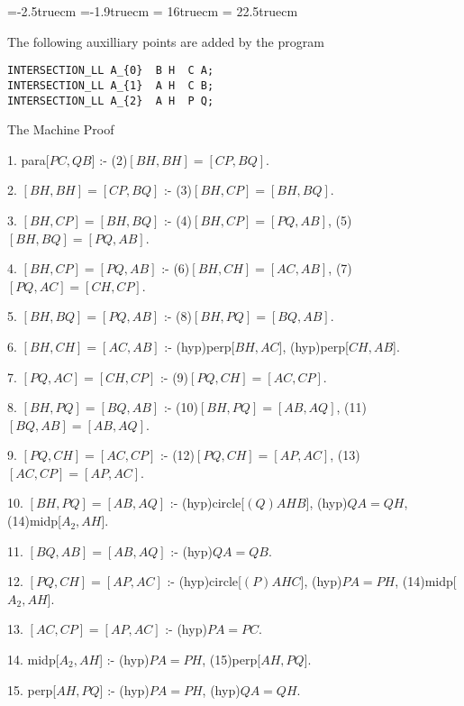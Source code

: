 \voffset=-2.5truecm
\hoffset=-1.9truecm
\textwidth = 16truecm
\textheight = 22.5truecm
\parskip=8pt
\parindent=15pt
\def\fa#1#2{\langle{#1},{#2}\rangle}

The following auxilliary points are added by the program

\begin{verbatim}
INTERSECTION_LL A_{0}  B H  C A;
INTERSECTION_LL A_{1}  A H  C B;
INTERSECTION_LL A_{2}  A H  P Q;
\end{verbatim}


{\vskip6pt \parskip=6pt \parindent=10pt 
The Machine Proof


1. para[$PC,QB$] :- (2)$[BH,BH]=[CP,BQ]$.

2. $[BH,BH]=[CP,BQ]$ :- (3)$[BH,CP]=[BH,BQ]$.

3. $[BH,CP]=[BH,BQ]$ :- (4)$[BH,CP]=[PQ,AB]$, (5)$[BH,BQ]=[PQ,AB]$.

4. $[BH,CP]=[PQ,AB]$ :- (6)$[BH,CH]=[AC,AB]$, (7)$[PQ,AC]=[CH,CP]$.

5. $[BH,BQ]=[PQ,AB]$ :- (8)$[BH,PQ]=[BQ,AB]$.

6. $[BH,CH]=[AC,AB]$ :- (hyp)perp[$BH,AC$], (hyp)perp[$CH,AB$].

7. $[PQ,AC]=[CH,CP]$ :- (9)$[PQ,CH]=[AC,CP]$.

8. $[BH,PQ]=[BQ,AB]$ :- (10)$[BH,PQ]=[AB,AQ]$, (11)$[BQ,AB]=[AB,AQ]$.

9. $[PQ,CH]=[AC,CP]$ :- (12)$[PQ,CH]=[AP,AC]$, (13)$[AC,CP]=[AP,AC]$.

10. $[BH,PQ]=[AB,AQ]$ :- (hyp)circle[$(Q)AHB$], (hyp)$QA = QH$, (14)midp[$A_{2},AH$].

11. $[BQ,AB]=[AB,AQ]$ :- (hyp)$QA = QB$.

12. $[PQ,CH]=[AP,AC]$ :- (hyp)circle[$(P)AHC$], (hyp)$PA = PH$, (14)midp[$A_{2},AH$].

13. $[AC,CP]=[AP,AC]$ :- (hyp)$PA = PC$.

14. midp[$A_{2},AH$] :- (hyp)$PA = PH$, (15)perp[$AH,PQ$].

15. perp[$AH,PQ$] :- (hyp)$PA = PH$, (hyp)$QA = QH$.
}

